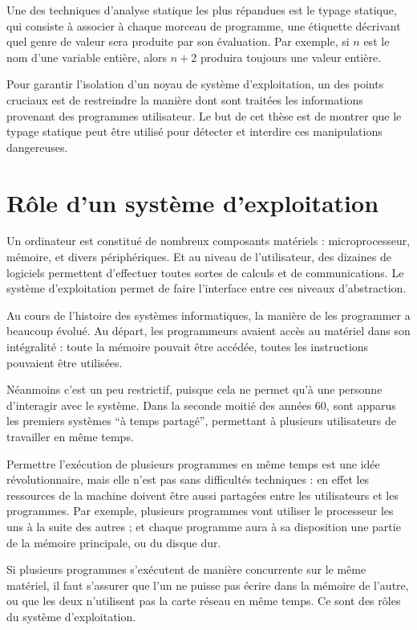 Une des techniques d'analyse statique les plus répandues est le typage statique,
qui consiste à associer à chaque morceau de programme, une étiquette
décrivant quel genre de valeur sera produite par son évaluation. Par exemple, si
$n$ est le nom d'une variable entière, alors $n + 2$ produira toujours une
valeur entière.

Pour garantir l'isolation d'un noyau de système d'exploitation, un des points
cruciaux est de restreindre la manière dont sont traitées les informations
provenant des programmes utilisateur. Le but de cet thèse est de montrer que le
typage statique peut être utilisé pour détecter et interdire ces manipulations
dangereuses.

\section{Rôle d'un système d'exploitation}

Un ordinateur est constitué de nombreux composants matériels : microprocesseur,
mémoire, et divers périphériques. Et au niveau de l'utilisateur, des dizaines de
logiciels permettent d'effectuer toutes sortes de calculs et de communications.
Le système d'exploitation permet de faire l'interface entre ces niveaux
d'abstraction.

Au cours de l'histoire des systèmes informatiques, la manière de les programmer
a beaucoup évolué. Au départ, les programmeurs avaient accès au matériel dans
son intégralité : toute la mémoire pouvait être accédée, toutes les instructions
pouvaient être utilisées.

Néanmoins c'est un peu restrictif, puisque cela ne permet qu'à une personne
d'interagir avec le système. Dans la seconde moitié des années 60, sont apparus
les premiers systèmes ``à temps partagé'', permettant à plusieurs utilisateurs
de travailler en même temps.

Permettre l'exécution de plusieurs programmes en même temps est une idée
révolutionnaire, mais elle n'est pas sans difficultés techniques : en effet les
ressources de la machine doivent être aussi partagées entre les utilisateurs et
les programmes. Par exemple, plusieurs programmes vont utiliser le processeur
les uns à la suite des autres ; et chaque programme aura à sa disposition une
partie de la mémoire principale, ou du disque dur.

Si plusieurs programmes s'exécutent de manière concurrente sur le même matériel,
il faut s'assurer que l'un ne puisse pas écrire dans la mémoire de l'autre, ou
que les deux n'utilisent pas la carte réseau en même temps. Ce sont des rôles du
système d'exploitation.

